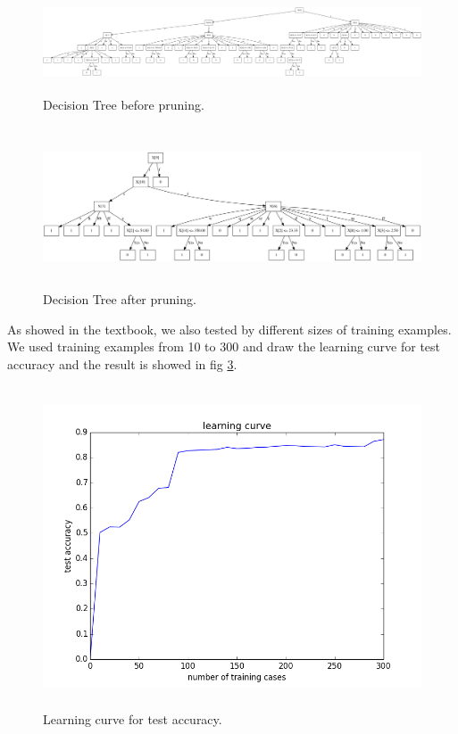 \documentclass[11pt]{article}
\begin{document}
\begin{figure}[h!]
\centering
\includegraphics[height=1.18in, width=6.5in]{before.png}
\caption{Decision Tree before pruning.}
\label{before}
\end{figure}

\begin{figure}[h!]
\centering
\includegraphics[height=1.875in, width=6.5in]{after.png}
\caption{Decision Tree after pruning.}
\label{after}
\end{figure}

As showed in the textbook, we also tested by different sizes of training examples. We used training examples from 10 to 300
and draw the learning curve for test accuracy and the result is showed in fig \ref{learn}.

\begin{figure}[h!]
\centering
\includegraphics[height=3.75in, width=5in]{learn.png}
\caption{Learning curve for test accuracy.}
\label{learn}
\end{figure}
\end{document}
